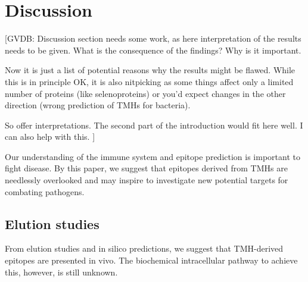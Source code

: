 \section{Discussion}

[GVDB: 
  Discussion section needs some work, 
  as here interpretation of the results needs to be given. 
  What is the consequence of the findings? Why is it important. 

  Now it is just a list of potential reasons why the results might be flawed. 
  While this is in principle OK, 
  it is also nitpicking as some things affect only a limited number of 
  proteins (like selenoproteins) 
  or you’d expect changes in the other direction (wrong prediction of TMHs for bacteria). 

  So offer interpretations. 
  The second part of the introduction would fit here well. I can also help with this.
]


Our understanding of the immune system and epitope prediction is 
important to fight disease. By this paper, we suggest that epitopes
derived from TMHs are needlessly overlooked and may inspire to investigate
new potential targets for combating pathogens.

\subsection{Elution studies}


From elution studies and in silico predictions, 
we suggest that TMH-derived epitopes are presented in vivo.
The biochemical intracellular pathway to achieve this,
however, is still unknown. 


